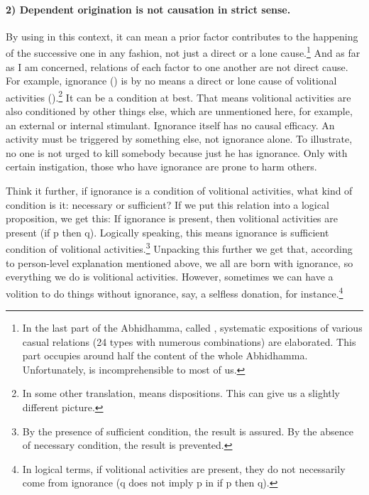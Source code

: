 \paragraph*{2) Dependent origination is not causation in strict sense.} By using  in this context, it can mean a prior factor contributes to the happening of the successive one in any fashion, not just a direct or a lone cause.\footnote{In the last part of the Abhidhamma, called , systematic expositions of various casual relations (24 types with numerous combinations) are elaborated. This part occupies around half the content of the whole Abhidhamma. Unfortunately,  is incomprehensible to most of us.} And as far as I am concerned, relations of each factor to one another are not direct cause. For example, ignorance () is by no means a direct or lone cause of volitional activities ().\footnote{In some other translation,  means dispositions. This can give us a slightly different picture.} It can be a condition at best. That means volitional activities are also conditioned by other things else, which are unmentioned here, for example, an external or internal stimulant. Ignorance itself has no causal efficacy. An activity must be triggered by something else, not ignorance alone. To illustrate, no one is not urged to kill somebody because just he has ignorance. Only with certain instigation, those who have ignorance are prone to harm others.

Think it further, if ignorance is a condition of volitional activities, what kind of condition is it: necessary or sufficient? If we put this relation into a logical proposition, we get this: If ignorance is present, then volitional activities are present (if p then q). Logically speaking, this means ignorance is sufficient condition of volitional activities.\footnote{By the presence of sufficient condition, the result is assured. By the absence of necessary condition, the result is prevented.} Unpacking this further we get that, according to person-level explanation mentioned above, we all are born with ignorance, so everything we do is volitional activities. However, sometimes we can have a volition to do things without ignorance, say, a selfless donation, for instance.\footnote{In logical terms, if volitional activities are present, they do not necessarily come from ignorance (q does not imply p in if p then q).}

